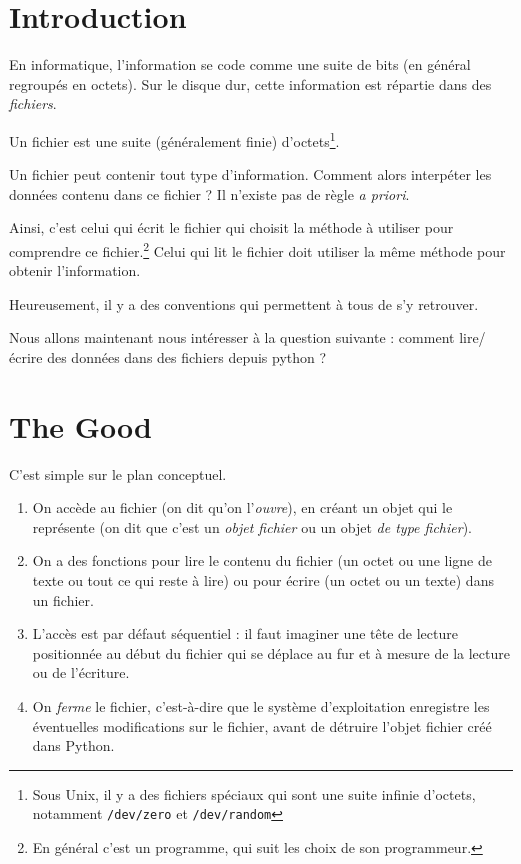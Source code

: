 \section{Introduction}

En informatique, l'information se code comme une suite de
bits (en général regroupés en octets). Sur le disque dur, cette information est répartie dans des \emph{fichiers}.


\begin{defi}
  Un fichier est une  suite (généralement finie) d'octets\footnote{Sous
    Unix, il y a des fichiers spéciaux qui sont une suite infinie
    d'octets, notamment \texttt{/dev/zero} et \texttt{/dev/random}}.
\end{defi}

Un fichier peut contenir tout type d'information. Comment alors interpéter les données contenu dans ce fichier ? Il n'existe pas de règle \emph{a priori}.

Ainsi, c'est celui qui écrit le fichier qui choisit la méthode à utiliser pour comprendre ce fichier.\footnote{En
      général c'est un programme, qui suit les choix de son  programmeur.} Celui qui lit le fichier doit utiliser la même méthode pour obtenir l'information.
      
Heureusement, il y a des conventions qui permettent à tous de s'y retrouver. 

Nous allons maintenant nous intéresser à la question suivante : comment lire/écrire des données dans des fichiers depuis python ?

\section{The Good}

C'est simple sur le plan conceptuel.
\begin{enumerate}
\item On accède au fichier (on dit qu'on l'\emph{ouvre}), en créant un objet
  qui le représente (on dit que c'est un \emph{objet fichier} ou un
  objet \emph{de type fichier}).
\item On a des fonctions pour lire le contenu du fichier (un octet ou une ligne de texte ou
  tout ce qui reste à lire) ou pour écrire (un octet ou un texte) dans un fichier.
\item L'accès est par défaut séquentiel : il faut imaginer une tête de
  lecture positionnée au début du fichier qui se déplace au fur et à
  mesure de la lecture ou de l'écriture.
\item On \emph{ferme} le fichier, c'est-à-dire que le système d'exploitation enregistre les éventuelles modifications sur le fichier, avant de détruire l'objet fichier créé dans Python.
\end{enumerate} 

